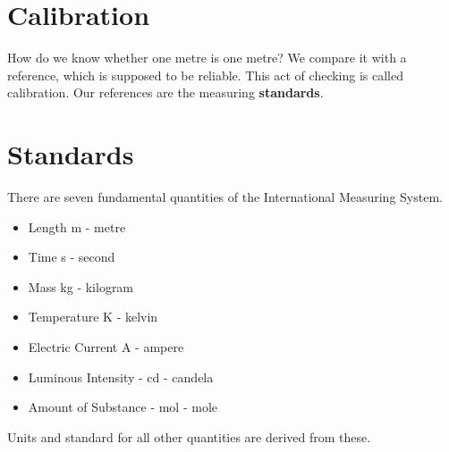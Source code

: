 \section{Calibration}
How do we know whether one metre is one metre? We compare it with a reference, which is supposed to be reliable. This act of checking is called calibration. Our references are the measuring \textbf{standards}.
\section{Standards}
There are seven fundamental quantities of the International Measuring System.
\begin{itemize}
  \item Length \si{\m} - metre
  \item Time \si{\second} - second
  \item Mass \si{\kg} - kilogram
  \item Temperature \si{\kelvin} - kelvin
  \item Electric Current \si{\ampere} - ampere
  \item Luminous Intensity - \si{\candela} - candela
  \item Amount of Substance - \si{\mol} - mole
\end{itemize}
Units and standard for all other quantities are derived from these.

